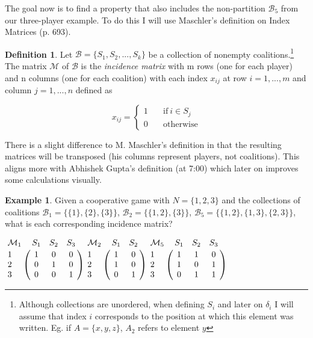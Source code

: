 \documentclass[10pt,a4paper,titlepage]{article}
\theoremstyle{plain}
\theoremstyle{definition}
\newtheorem{definition}[thm]{Definition} %
\newtheorem{example}[thm]{Example} %
\begin{document}
The goal now is to find a property that also includes the non-partition $\mathcal{B}_5$ from our three-player example. To do this I will use Maschler's\cite{maschler} definition on Index Matrices (p. 693).

\begin{definition}\label{def:incidencematrix}
    Let $\mathcal{B} = \{S_1, S_2, ..., S_k\}$ be a collection of nonempty coalitions.\footnote{Although collections are unordered, when defining $S_i$ and later on $\delta_i$ I will assume that index $i$ corresponds to the position at which this element was written. Eg. if $A = \{x, y, z\}$, $A_2$ refers to element $y$} The matrix $\mathcal{M}$ of $\mathcal{B}$ is the \textit{incidence matrix} with m rows (one for each player) and n columns (one for each coalition) with each index $x_{ij}$ at row $i = {1, ..., m}$ and column $j = {1, ..., n}$ defined as\vspace{-15pt}

    \begin{equation*}
        x_{ij} =
        \begin{cases}
            1 & \quad\text{if}\ i \in S_j\\
            0 & \quad\text{otherwise}
        \end{cases}
    \end{equation*}
\end{definition}

There is a slight difference to M. Maschler's\cite{maschler} definition in that the resulting matrices will be transposed (his columns represent players, not coalitions). This aligns more with Abhishek Gupta's\cite{youtube} definition (at 7:00) which later on improves some calculations visually.

\begin{example}\label{ex:indexmatrix}
    Given a cooperative game with $N = \{1, 2, 3\}$ and the collections of coalitions $\mathcal{B}_1 = \{\{1\}, \{2\}, \{3\}\}$, $\mathcal{B}_2 = \{\{1, 2\}, \{3\}\}$, $\mathcal{B}_5 = \{\{1, 2\}, \{1, 3\}, \{2, 3\}\}$, what is each corresponding incidence matrix?\vspace{8pt}

    $
    \bordermatrix{
    \mathcal{M}_1 & S_1 & S_2 & S_3 \cr
    1 & 1 & 0 & 0 \cr
    2 & 0 & 1 & 0 \cr
    3 & 0 & 0 & 1 \cr
    }
    $\hspace{35pt}$
    \bordermatrix{
    \mathcal{M}_2 & S_1 & S_2\cr
    1 & 1 & 0 \cr
    2 & 1 & 0 \cr
    3 & 0 & 1 \cr
    }
    $\hspace{35pt}$
    \bordermatrix{
    \mathcal{M}_5 & S_1 & S_2 & S_3 \cr
    1 & 1 & 1 & 0 \cr
    2 & 1 & 0 & 1 \cr
    3 & 0 & 1 & 1 \cr
    }
    $\vspace{8pt}
\end{example}
\end{document}
